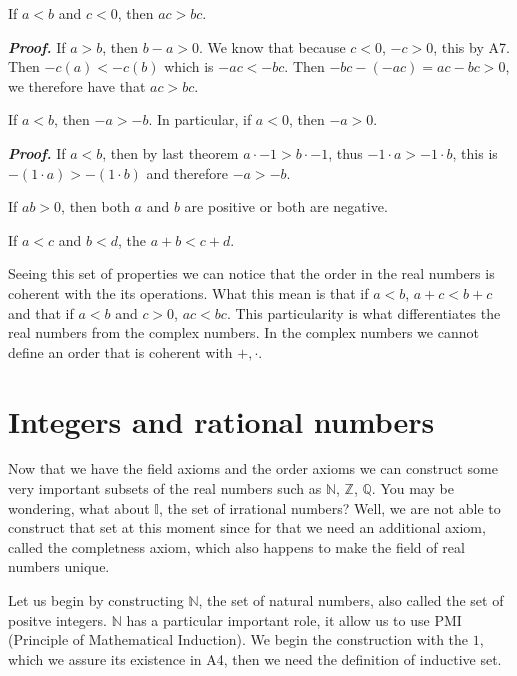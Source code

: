 \documentclass{report}
\begin{document}
    \begin{thBox}
        If $a<b$ and $c<0$, then $ac>bc$.
    \end{thBox}
    \textit{\textbf{Proof.}} If $a>b$, then $b-a>0$. We know that because $c<0$, $-c>0$, this by A7. Then $-c(a) < -c(b)$ which is $-ac < -bc$. Then $-bc - (-ac) = ac-bc > 0$, we therefore have that $ac>bc$.\\

    \begin{thBox}
        If $a<b$, then $-a>-b$. In particular, if $a<0$, then $-a>0$.
    \end{thBox}
    \textit{\textbf{Proof.}} If $a<b$, then by last theorem $a \cdot -1 > b \cdot -1$, thus $-1 \cdot a > -1 \cdot b$, this is $-(1 \cdot a) > -(1 \cdot b)$ and therefore $-a>-b$.\\

    \begin{thBox}
        If $ab>0$, then both $a$ and $b$ are positive or both are negative.
    \end{thBox}

    \begin{thBox}
        If $a<c$ and $b<d$, the $a+b<c+d$.
    \end{thBox}

    Seeing this set of properties we can notice that the order in the real numbers is coherent with the its operations. What this mean is that if $a<b$, $a+c<b+c$ and that if $a<b$ and $c>0$, $ac <bc$. This particularity is what differentiates the real numbers from the complex numbers. In the complex numbers we cannot define an order that is coherent with $+, \cdot$.

    \section{Integers and rational numbers}

    Now that we have the field axioms and the order axioms we can construct some very important subsets of the real numbers such as $\mathbb{N}$, $\mathbb{Z}$, $\mathbb{Q}$. You may be wondering, what about $\mathbb{I}$, the set of irrational numbers? Well, we are not able to construct that set at this moment since for that we need an additional axiom, called the completness axiom, which also happens to make the field of real numbers unique.

    Let us begin by constructing $\mathbb{N}$, the set of natural numbers, also called the set of positve integers. $\mathbb{N}$ has a particular important role, it allow us to use PMI (Principle of Mathematical Induction). We begin the construction with the $1$, which we assure its existence in A4, then we need the definition of inductive set.
\end{document}
